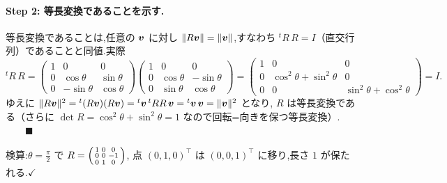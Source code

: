 \documentclass[11pt,a4paper]{article}
\begin{document}
\paragraph{Step 2: 等長変換であることを示す.}
等長変換であることは,任意の $\bm{v}$ に対し $\|R\bm{v}\|=\|\bm{v}\|$,すなわち
${}^tR\,R=I$（直交行列）であることと同値.実際
\[
{}^tR\,R=
\begin{pmatrix}1&0&0\\0&\cos\theta&\sin\theta\\0&-\sin\theta&\cos\theta\end{pmatrix}
\begin{pmatrix}1&0&0\\0&\cos\theta&-\sin\theta\\0&\sin\theta&\cos\theta\end{pmatrix}
=\begin{pmatrix}1&0&0\\0&\cos^2\theta+\sin^2\theta&0\\0&0&\sin^2\theta+\cos^2\theta\end{pmatrix}=I.
\]
ゆえに $\|R\bm{v}\|^2={}^t(R\bm{v})(R\bm{v})={}^t\bm{v}\,{}^tR R\,\bm{v}={}^t\bm{v}\,\bm{v}=\|\bm{v}\|^2$ となり,
$R$ は等長変換である（さらに $\det R=\cos^2\theta+\sin^2\theta=1$ なので回転=向きを保つ等長変換）.$\qquad\blacksquare$

検算:$\theta=\frac\pi2$ で $R=\begin{psmallmatrix}1&0&0\\0&0&-1\\0&1&0\end{psmallmatrix}$,
点 $(0,1,0)^\top$ は $(0,0,1)^\top$ に移り,長さ $1$ が保たれる.$\checkmark$
\end{document}
